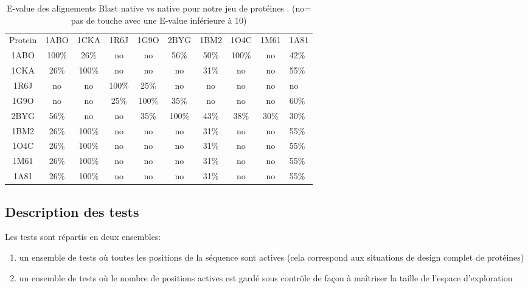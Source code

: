     \begin{table}[!htbp]
      \centering

      \begin{tabular}{ccccccccc}

        \toprule
     Protein & 1ABO  & 1CKA  & 1R6J & 1G9O & 2BYG & 1BM2  & 1O4C  & 1M61 & 1A81 \\
        1ABO & 100\% &  26\% & no   & no   & 56\% & 50\%  & 100\% & no   & 42\%  \\     
        1CKA &  26\% & 100\% & no   & no   & no   & 31\%  &  no   &  no  &  55\% \\
        1R6J &  no   & no    & 100\%& 25\% & no   & no    &  no   &  no  &  no   \\ 
        1G9O &  no   & no    & 25\% & 100\%& 35\% & no    &  no   &  no  &  60\% \\
        2BYG &  56\% & no    & no   & 35\% & 100\%& 43\%  &  38\% &  30\%&  30\% \\
        1BM2 &  26\% & 100\% & no   & no   & no   & 31\%  &  no   &  no  &  55\% \\
        1O4C &  26\% & 100\% & no   & no   & no   & 31\%  &  no   &  no  &  55\% \\
        1M61 &  26\% & 100\% & no   & no   & no   & 31\%  &  no   &  no  &  55\% \\
        1A81 &  26\% & 100\% & no   & no   & no   & 31\%  &  no   &  no  &  55\% \\
        \bottomrule


      \end{tabular}      
      \caption{E-value des alignements Blast native vs native pour notre jeu de protéines . (no= pas de touche avec une E-value inférieure à 10)}
\label{tab:Xblast}      
    \end{table}







\subsection{Description des tests}
\label{sec:description_tests}
Les tests sont répartis en deux ensembles:
\begin{enumerate}
\item un ensemble de tests où toutes les positions de la séquence sont actives (cela correspond aux situations de design complet de protéines) 
\item un ensemble de tests où le nombre de positions actives est gardé sous contrôle de façon à maîtriser la taille de l'espace d'exploration
\end{enumerate}


